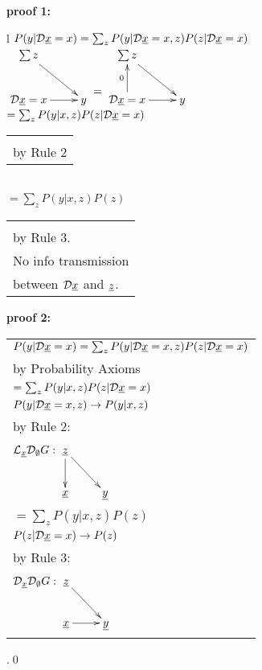 \proof

{\bf * proof 1:}
\begin{longtable}{l}
\color{red}
$P(y|{\cal D}{\underline{x}}=x)=\sum_z
 P(y|{\cal D} {\underline{x}}=x, z)P(z|{\cal D}{\underline{x}} =x)$
\\
$\xymatrix{
\sum z\ar[dr]
\\
\cald \rvx=x\ar[r]
&y
}
\xymatrix{\\=}
\xymatrix{
\sum z\ar[dr]
\\
\cald \rvx=x\ar[r]\ar[u]^0
&y
}
$
\\
\color{red}
$=\sum_z P(y|x,z)P(z|{\cal D}{\underline{x}}=x)$
\\
\xymatrix{\\=}
\begin{tabular}{l}
\\
\\
by Rule 2
\end{tabular}
\\
\color{red}
$=\sum_z P(y|x,z)P(z)$
\\
\xymatrix{\\
=}
\begin{tabular}{l}\\
\\
by Rule 3.
\\
No info transmission\\
between ${\cal D}{\underline{x}}$ and ${\underline{z}}$.
\end{tabular}
\end{longtable}


{\bf * proof 2:}
\begin{longtable}{l}
\color{red}
$P(y|{\cal D}{\underline{x}}=x)
=
\sum_z
P(y|{\cal D}{\underline{x}}=x, z)
P(z|{\cal D}{\underline{x}}=x)$
\\
\quad by Probability Axioms
\\
\color{red}
$=\sum_z
P(y|x, z)
P(z|{\cal D}{\underline{x}}=x)$
\\
\quad $P(y|{\cal D} {\underline{x}}=x, z)\rightarrow
P(y|x, z)$
\\
\quad  by Rule 2:
\begin{tabular}{l}
\\
\end{tabular}
\\
\quad
$\call_\rvx\cald_\emptyset G:
\xymatrix{
\rvz\ar[d]\ar[rd]
\\
\rvx
&\rvy
}$
\\
\color{red}
$=\sum_z
P(y|x, z)
P(z)$
\\
\quad $P(z|{\cal D} {\underline{x}}=x)\rightarrow
P(z)$
\\
\quad  by Rule 3:
\begin{tabular}{l}
\\
\end{tabular}
\\
\quad
$\cald_\rvx \cald_\emptyset G:
\xymatrix{
\rvz\ar[rd]
\\
\rvx\ar[r]
&\rvy
}
$
\end{longtable}
.\qed


